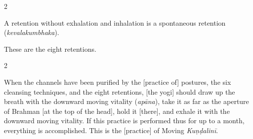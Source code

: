 \begin{nohyp}
\begin{multicols}{2}
\begin{eng}

A retention without exhalation and inhalation is a spontaneous retention (\textit{kevalakumbhaka}).

These are the eight retentions.
\end{eng}
\end{multicols}
\vskip 7pt

\begin{eng}
\end{eng}
\vskip 7pt

\begin{multicols}{2}
\begin{eng}

When the channels have been purified by the [practice of] postures, the six cleansing techniques, and the eight retentions, [the yogi] should draw up the breath with the downward moving vitality (\textit{apāna}), take it as far as the aperture of Brahman [at the top of the head], hold it [there], and exhale it with the downward moving vitality. If this practice is performed thus for up to a month, everything is accomplished. This is the [practice] of Moving \textit{Kuṇḍalinī}.
\end{eng}
\end{multicols}
\end{nohyp}

\newpage

\null\vspace{0.1cm}

\begin{kan}
\end{kan}
\vskip 7pt

